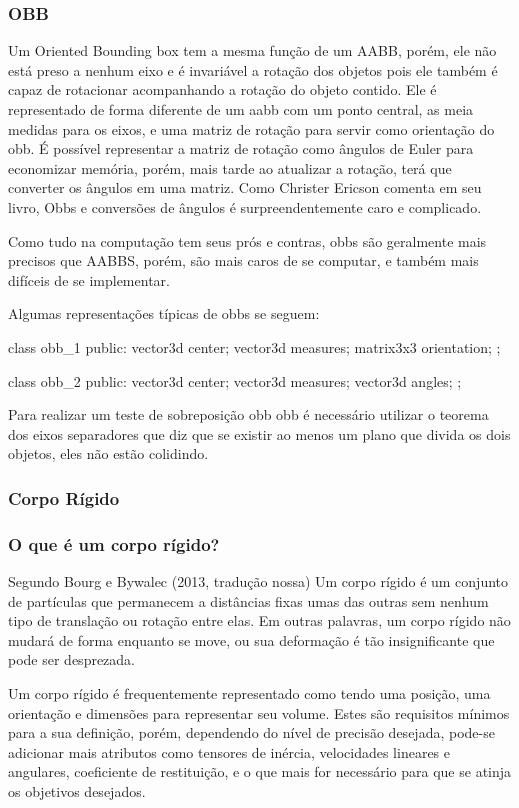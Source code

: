 \subsubsection{OBB}

Um Oriented Bounding box tem a mesma função de um AABB, porém, ele não está
preso a nenhum eixo e é invariável a rotação dos objetos pois ele também é
capaz de rotacionar acompanhando a rotação do objeto contido. Ele é
representado de forma diferente de um aabb com um ponto central, as meia
medidas para os eixos, e uma matriz de rotação para servir como orientação do
obb. É possível representar a matriz de rotação como ângulos de Euler para
economizar memória, porém, mais tarde ao atualizar a rotação, terá que
converter os ângulos em uma matriz. Como Christer Ericson comenta em seu livro,
Obbs e conversões de ângulos é surpreendentemente caro e complicado.

Como tudo na computação tem seus prós e contras, obbs são geralmente mais
precisos que AABBS, porém, são mais caros de se computar, e também mais
difíceis de se implementar.


Algumas representações típicas de obbs se seguem:

class obb_1
{
public:
vector3d center;
vector3d measures;
matrix3x3 orientation;
};

class obb_2
{
public:
vector3d center;
vector3d measures;
vector3d angles;
};

Para realizar um teste de sobreposição obb obb é necessário utilizar o teorema
dos eixos separadores que diz que se existir ao menos um plano que divida os
dois objetos, eles não estão colidindo.



\subsubsection{ Corpo Rígido}
\subsubsection{ O que é um corpo rígido?}

Segundo Bourg e Bywalec (2013, tradução nossa) Um corpo rígido é um conjunto de partículas  que permanecem a distâncias fixas umas das outras  sem nenhum tipo de translação ou rotação entre elas. Em outras palavras,  um corpo rígido não mudará de forma enquanto se move, ou sua deformação é tão insignificante que pode ser desprezada.

Um corpo rígido é  frequentemente representado como tendo uma posição, uma orientação  e  dimensões para representar seu volume. Estes são requisitos mínimos para a  sua definição, porém, dependendo do nível de precisão desejada, pode-se adicionar mais atributos como tensores de inércia, velocidades lineares e angulares, coeficiente de restituição, e o que mais for necessário para que se atinja os objetivos desejados.

